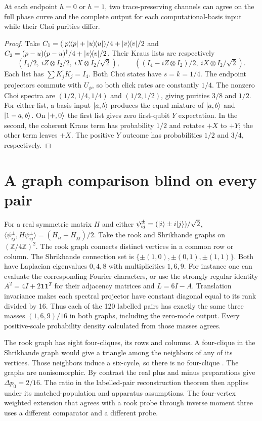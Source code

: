 \documentclass[11pt,letterpaper]{article}
\begin{document}
\begin{proposition}
At each endpoint $h=0$ or $h=1$, two trace-preserving channels can agree on the full phase curve and the complete output for each computational-basis input while their Choi purities differ.
\end{proposition}
\begin{proof}
Take $C_1=(\lvert p\rangle\!\langle p\rvert+\lvert u\rangle\!\langle u\rvert)/4+\lvert v\rangle\!\langle v\rvert/2$ and $C_2=(p-u)(p-u)^\dagger/4+\lvert v\rangle\!\langle v\rvert/2$. Their Kraus lists are respectively
\[
 (I_4/2,\ iZ\otimes I_2/2,\ iX\otimes I_2/\sqrt2),\qquad
 ((I_4-iZ\otimes I_2)/2,\ iX\otimes I_2/\sqrt2).
\]
Each list has $\sum K_j^\dagger K_j=I_4$. Both Choi states have $s=k=1/4$. The endpoint projectors commute with $U_\phi$, so both click rates are constantly $1/4$. The nonzero Choi spectra are $(1/2,1/4,1/4)$ and $(1/2,1/2)$, giving purities $3/8$ and $1/2$. For either list, a basis input $\lvert a,b\rangle$ produces the equal mixture of $\lvert a,b\rangle$ and $\lvert1-a,b\rangle$. On $\lvert+,0\rangle$ the first list gives zero first-qubit $Y$ expectation. In the second, the coherent Kraus term has probability $1/2$ and rotates $+X$ to $+Y$; the other term leaves $+X$. The positive $Y$ outcome has probabilities $1/2$ and $3/4$, respectively.
\end{proof}

\section{A graph comparison blind on every pair}
For a real symmetric matrix $H$ and either $\psi_{ij}^\pm=(\lvert i\rangle\pm i\lvert j\rangle)/\sqrt2$,
$\langle \psi_{ij}^\pm,H\psi_{ij}^\pm\rangle=(H_{ii}+H_{jj})/2$.
Take the rook and Shrikhande graphs on $(\mathbb Z/4\mathbb Z)^2$. The rook graph connects distinct vertices in a common row or column. The Shrikhande connection set is $\{\pm(1,0),\pm(0,1),\pm(1,1)\}$. Both have Laplacian eigenvalues $0,4,8$ with multiplicities $1,6,9$. For instance one can evaluate the corresponding Fourier characters, or use the strongly regular identity $A^2=4I+2\mathbf1\mathbf1^T$ for their adjacency matrices and $L=6I-A$. Translation invariance makes each spectral projector have constant diagonal equal to its rank divided by 16. Thus each of the 120 labelled pairs has exactly the same three masses $(1,6,9)/16$ in both graphs, including the zero-mode output. Every positive-scale probability density calculated from those masses agrees.

The rook graph has eight four-cliques, its rows and columns. A four-clique in the Shrikhande graph would give a triangle among the neighbors of any of its vertices. Those neighbors induce a six-cycle, so there is no four-clique \cite{brouwer}. The graphs are nonisomorphic. By contrast the real plus and minus preparations give $\Delta p_0=2/16$. The ratio in the labelled-pair reconstruction theorem then applies under its matched-population and apparatus assumptions. The four-vertex weighted extension that agrees with a rook probe through inverse moment three uses a different comparator and a different probe.
\end{document}
